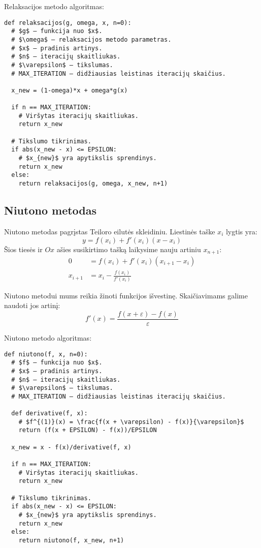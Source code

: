 Relaksacijos metodo algoritmas:
\begin{verbatim}
def relaksacijos(g, omega, x, n=0):
  # $g$ – funkcija nuo $x$.
  # $\omega$ – relaksacijos metodo parametras.
  # $x$ – pradinis artinys.
  # $n$ – iteracijų skaitliukas.
  # $\varepsilon$ – tikslumas.
  # MAX_ITERATION – didžiausias leistinas iteracijų skaičius.

  x_new = (1-omega)*x + omega*g(x)

  if n == MAX_ITERATION:
    # Viršytas iteracijų skaitliukas.
    return x_new

  # Tikslumo tikrinimas.
  if abs(x_new - x) <= EPSILON:
    # $x_{new}$ yra apytikslis sprendinys.
    return x_new
  else:
    return relaksacijos(g, omega, x_new, n+1)
\end{verbatim}

\subsection{Niutono metodas}

\cite[36-39]{textbook} 


Niutono metodas pagrįstas Teiloro eilutės skleidiniu. Liestinės taške
$x_{i}$ lygtis yra:
\begin{equation*}
  y = f(x_{i}) + f'(x_{i})(x - x_{i})
\end{equation*}
Šios tiesės ir $Ox$ ašies susikirtimo tašką laikysime nauju artiniu $x_{n+1}$:
\begin{align*}
  0 &= f(x_{i}) + f'(x_{i})(x_{i+1} - x_{i}) \\
  x_{i+1} &= x_{i} - \frac{f(x_{i})}{f'(x_{i})}
\end{align*}

Niutono metodui mums reikia žinoti funkcijos išvestinę. Skaičiavimams galime
naudoti jos artinį:
\begin{equation*}
  f'(x) = \frac{f(x + \varepsilon) - f(x)}{\varepsilon}
\end{equation*}


Niutono metodo algoritmas:
\begin{verbatim}
def niutono(f, x, n=0):
  # $f$ – funkcija nuo $x$.
  # $x$ – pradinis artinys.
  # $n$ – iteracijų skaitliukas.
  # $\varepsilon$ – tikslumas.
  # MAX_ITERATION – didžiausias leistinas iteracijų skaičius.

  def derivative(f, x):
    # $f^{(1)}(x) = \frac{f(x + \varepsilon) - f(x)}{\varepsilon}$
    return (f(x + EPSILON) - f(x))/EPSILON

  x_new = x - f(x)/derivative(f, x)

  if n == MAX_ITERATION:
    # Viršytas iteracijų skaitliukas.
    return x_new

  # Tikslumo tikrinimas.
  if abs(x_new - x) <= EPSILON:
    # $x_{new}$ yra apytikslis sprendinys.
    return x_new
  else:
    return niutono(f, x_new, n+1)
\end{verbatim}

